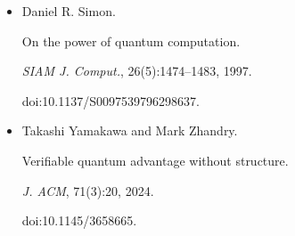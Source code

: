 \begin{itemize}
\item[] 
[22]

Daniel R. Simon.


On the power of quantum computation.


\emph{SIAM J. Comput.}, 26(5):1474–1483, 1997.


doi:10.1137/S0097539796298637.





\item[] 
[23]

Takashi Yamakawa and Mark Zhandry.


Verifiable quantum advantage without structure.


\emph{J. ACM}, 71(3):20, 2024.


doi:10.1145/3658665.





\end{itemize}

